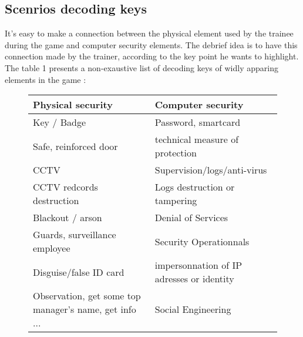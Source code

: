 \documentclass[11pt]{article} %
\begin{document}
\subsection{Scenrios decoding keys}
It's easy to make a connection between the physical element used by the trainee during 
the game and computer security elements. The debrief idea is to have this connection made 
by the trainer, according to the key point he wants to highlight. The table 1 presents a 
non-exaustive list of decoding keys of widly apparing elements in the game : 

\begin{figure}
    \begin{tabularx}{\textwidth}{|X|X|}
    \hline
Physical security & Computer security \\ \hline
Key / Badge & Password, smartcard \\
Safe, reinforced door & technical measure of protection \\
CCTV & Supervision/logs/anti-virus \\
CCTV redcords destruction & Logs destruction or tampering \\
Blackout / arson & Denial of Services \\
Guards, surveillance employee & Security Operationnals \\
Disguise/false ID card & impersonnation of IP adresses or identity \\
Observation, get some top manager's name, get info ... & Social Engineering \\

\end{tabularx}
\end{figure}
\end{document}
